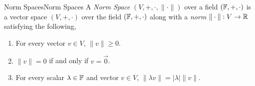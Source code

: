 \documentclass{article}
\begin{document}
\begin{definition}{Norm Spaces}{Norm Spaces}
    A \emph{Norm Space} $\left(V, +, \cdot, \|\cdot\|\right)$ over a field $\left(\mathbb{F}, +, \cdot\right)$
    is a vector space $\left(V, +, \cdot\right)$ over the field $\left(\mathbb{F}, +, \cdot\right)$ along with a \emph{norm} $\|\cdot\| : V \rightarrow \mathbb{R}$  satisfying the following,

    \begin{enumerate}[label=(\roman*)]
        \item For every vector $v \in V$, $\|v\| \geq 0$.
        \item $\|v\| = 0$ if and only if $v = \vec{0}$.
        \item For every scalar $\lambda \in \mathbb{F}$ and vector $v \in V$, $\|\lambda v\| = |\lambda|\|v\|$.
    \end{enumerate}
\end{definition}
\end{document}
